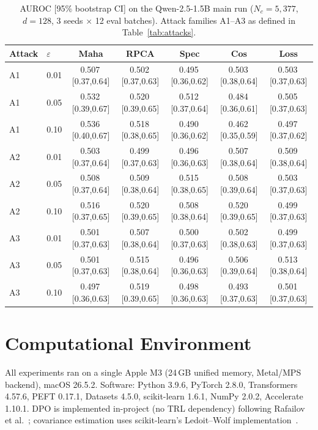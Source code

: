 \documentclass[runningheads]{llncs}
\begin{document}
\begin{table}[h]
\centering
\caption{AUROC [95\% bootstrap CI] on the Qwen-2.5-1.5B main run
  ($N_c = 5{,}377$, $d = 128$, 3 seeds $\times$ 12 eval batches). Attack
  families A1--A3 as defined in Table~\ref{tab:attacks}.}
\label{tab:fullci}
\scriptsize
\setlength{\tabcolsep}{2.5pt}
\begin{tabular}{@{}llccccc@{}}
\toprule
\textbf{Attack} & $\varepsilon$ & \textbf{Maha} & \textbf{RPCA} & \textbf{Spec} & \textbf{Cos} & \textbf{Loss} \\
\midrule
A1 & 0.01 & 0.507\,[0.37,0.64] & 0.502\,[0.37,0.63] & 0.495\,[0.36,0.62] & 0.503\,[0.38,0.64] & 0.503\,[0.37,0.63] \\
A1 & 0.05 & 0.532\,[0.39,0.67] & 0.520\,[0.39,0.65] & 0.512\,[0.37,0.64] & 0.484\,[0.36,0.61] & 0.505\,[0.37,0.63] \\
A1 & 0.10 & 0.536\,[0.40,0.67] & 0.518\,[0.38,0.65] & 0.490\,[0.36,0.62] & 0.462\,[0.35,0.59] & 0.497\,[0.37,0.62] \\
\midrule
A2 & 0.01 & 0.503\,[0.37,0.64] & 0.499\,[0.37,0.63] & 0.496\,[0.36,0.63] & 0.507\,[0.38,0.64] & 0.509\,[0.38,0.64] \\
A2 & 0.05 & 0.508\,[0.37,0.64] & 0.509\,[0.38,0.64] & 0.515\,[0.38,0.65] & 0.508\,[0.39,0.64] & 0.503\,[0.37,0.63] \\
A2 & 0.10 & 0.516\,[0.37,0.65] & 0.520\,[0.39,0.65] & 0.508\,[0.38,0.64] & 0.520\,[0.39,0.65] & 0.499\,[0.37,0.63] \\
\midrule
A3 & 0.01 & 0.501\,[0.37,0.63] & 0.507\,[0.38,0.64] & 0.500\,[0.37,0.63] & 0.502\,[0.38,0.63] & 0.499\,[0.37,0.63] \\
A3 & 0.05 & 0.501\,[0.37,0.63] & 0.515\,[0.38,0.64] & 0.496\,[0.36,0.63] & 0.506\,[0.39,0.64] & 0.513\,[0.38,0.64] \\
A3 & 0.10 & 0.497\,[0.36,0.63] & 0.519\,[0.39,0.65] & 0.498\,[0.36,0.63] & 0.493\,[0.37,0.63] & 0.501\,[0.37,0.63] \\
\bottomrule
\end{tabular}
\end{table}

\section{Computational Environment}\label{app:env}

All experiments ran on a single Apple M3 (24\,GB unified memory, Metal/MPS
backend), macOS 26.5.2. Software: Python 3.9.6, PyTorch 2.8.0, Transformers
4.57.6, PEFT 0.17.1, Datasets 4.5.0, scikit-learn 1.6.1, NumPy 2.0.2,
Accelerate 1.10.1. DPO is implemented in-project (no TRL dependency) following
Rafailov et al.~\cite{rafailov2023dpo}; covariance estimation uses
scikit-learn's Ledoit--Wolf implementation~\cite{ledoit2004well}.



\end{document}
